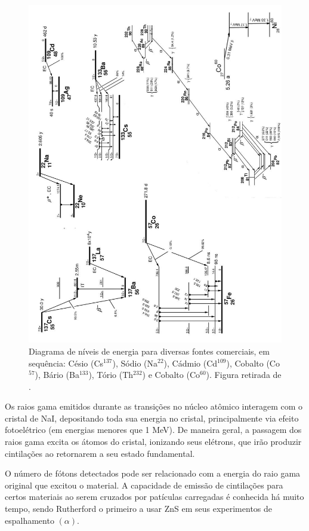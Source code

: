 \documentclass[a4paper, 11pt, notitlepage]{article}
\numberwithin{equation}{section}  %
\begin{document}
\graphicspath{{relatorio/}}
\begin{figure}[H]
\centering
\includegraphics[scale=0.5]{fontes.jpg}
\caption{Diagrama de níveis de energia para diversas fontes comerciais, em sequência: Césio (Cs$^{137}$), Sódio (Na$^{22}$), Cádmio (Cd$^{109}$), Cobalto (Co$^{57}$), Bário (Ba$^{133}$), Tório (Th$^{232}$) e Cobalto (Co$^{60}$). Figura retirada de \cite{peterson1996}.}
\label{fig:diagrama.niveis}
\end{figure}

Os raios gama emitidos durante as transições no núcleo atômico interagem com o cristal de NaI, depositando toda sua energia no cristal, principalmente via efeito fotoelétrico (em energias menores que 1 MeV). De maneira geral, a passagem dos raios gama excita os átomos do cristal, ionizando seus elétrons, que irão produzir cintilações ao retornarem a seu estado fundamental.

O número de fótons detectados pode ser relacionado com a energia do raio gama original que excitou o material. A capacidade de emissão de cintilações para certos materiais ao serem cruzados por patículas carregadas é conhecida há muito tempo, sendo Rutherford o primeiro a usar ZnS em seus experimentos de espalhamento $(\alpha)$.
\end{document}
